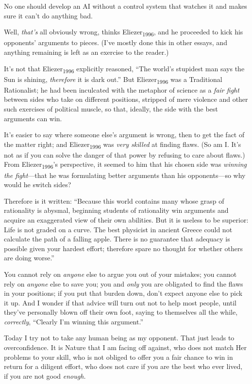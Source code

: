 {
 No one should develop an AI without a control system that watches
it and makes sure it can't do anything bad.}

{
 Well, \textit{that's} all obviously wrong, thinks
Eliezer\textsubscript{1996}, and he proceeded to kick his
opponents' arguments to pieces. (I've
mostly done this in other essays, and anything remaining is left as an
exercise to the reader.)}

{
 It's not that Eliezer\textsubscript{1996}
explicitly reasoned, ``The world's
stupidest man says the Sun is shining, \textit{therefore} it is dark
out.'' But Eliezer\textsubscript{1996} was a
Traditional Rationalist; he had been inculcated with the metaphor of
science as a \textit{fair fight} between sides who take on different
positions, stripped of mere violence and other such exercises of
political muscle, so that, ideally, the side with the best arguments
can win.}

{
 It's easier to say where someone
else's argument is wrong, then to get the fact of the
matter right; and Eliezer\textsubscript{1996} was \textit{very skilled}
at finding flaws. (So am I. It's not as if you can
solve the danger of that power by refusing to care about flaws.) From
Eliezer\textsubscript{1996}'s perspective, it seemed to
him that his chosen side was \textit{winning the fight}{}---that he was
formulating better arguments than his opponents---so why would he
switch sides?}

{
 Therefore is it written: ``Because this world
contains many whose grasp of rationality is abysmal, beginning students
of rationality win arguments and acquire an exaggerated view of their
own abilities. But it is useless to be superior: Life is not graded on
a curve. The best physicist in ancient Greece could not calculate the
path of a falling apple. There is no guarantee that adequacy is
possible given your hardest effort; therefore spare no thought for
whether others are doing worse.''}

{
 You cannot rely on \textit{anyone} else to argue you out of your
mistakes; you cannot rely on \textit{anyone} else to save you; you and
\textit{only} you are obligated to find the flaws in your positions; if
you put that burden down, don't expect anyone else to
pick it up. And I wonder if that advice will turn out not to help most
people, until they've personally blown off their own
foot, saying to themselves all the while, \textit{correctly},
``Clearly I'm winning this
argument.''}

{
 Today I try not to take any human being as my opponent. That just
leads to overconfidence. It is Nature that I am facing off against, who
does not match Her problems to your skill, who is not obliged to offer
you a fair chance to win in return for a diligent effort, who does not
care if you are the best who ever lived, if you are not good
\textit{enough.}}

